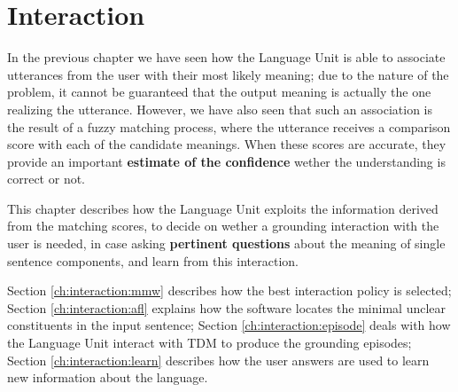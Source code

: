 
\chapter{Interaction} %

\label{ch:interaction} %


In the previous chapter we have seen how the Language Unit is able to associate utterances from the user with their most likely meaning; due to the nature of the problem, it cannot be guaranteed that the output meaning is actually the one realizing the utterance. However, we have also seen that such an association is the result of a fuzzy matching process, where the utterance receives a comparison score with each of the candidate meanings. When these scores are accurate, they provide an important \textbf{estimate of the confidence} wether the understanding is correct or not.

This chapter describes how the Language Unit exploits the information derived from the matching scores, to decide on wether a grounding interaction with the user is needed, in case asking \textbf{pertinent questions} about the meaning of single sentence components, and learn from this interaction. 

Section \ref{ch:interaction:mmw} describes how the best interaction policy is selected; Section \ref{ch:interaction:afl} explains how the software locates the minimal unclear constituents in the input sentence; Section \ref{ch:interaction:episode} deals with how the Language Unit interact with TDM to produce the grounding episodes; Section \ref{ch:interaction:learn} describes how the user answers are used to learn new information about the language.


